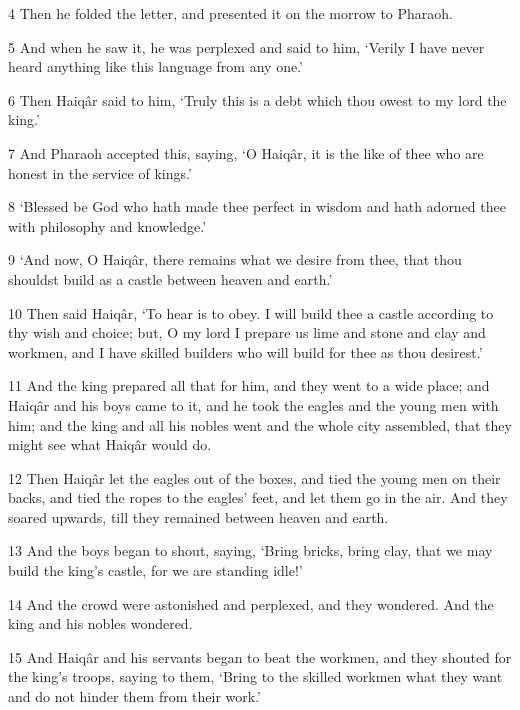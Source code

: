 \par 4 Then he folded the letter, and presented it on the morrow to Pharaoh.

\par 5 And when he saw it, he was perplexed and said to him, ‘Verily I have never heard anything like this language from any one.’

\par 6 Then Haiqâr said to him, ‘Truly this is a debt which thou owest to my lord the king.’

\par 7 And Pharaoh accepted this, saying, ‘O Haiqâr, it is the like of thee who are honest in the service of kings.’

\par 8 ‘Blessed be God who hath made thee perfect in wisdom and hath adorned thee with philosophy and knowledge.’

\par 9 ‘And now, O Haiqâr, there remains what we desire from thee, that thou shouldst build as a castle between heaven and earth.’

\par 10 Then said Haiqâr, ‘To hear is to obey. I will build thee a castle according to thy wish and choice; but, O my lord I prepare us lime and stone and clay and workmen, and I have skilled builders who will build for thee as thou desirest.’

\par 11 And the king prepared all that for him, and they went to a wide place; and Haiqâr and his boys came to it, and he took the eagles and the young men with him; and the king and all his nobles went and the whole city assembled, that they might see what Haiqâr would do.

\par 12 Then Haiqâr let the eagles out of the boxes, and tied the young men on their backs, and tied the ropes to the eagles' feet, and let them go in the air. And they soared upwards, till they remained between heaven and earth.

\par 13 And the boys began to shout, saying, ‘Bring bricks, bring clay, that we may build the king's castle, for we are standing idle!’

\par 14 And the crowd were astonished and perplexed, and they wondered. And the king and his nobles wondered.

\par 15 And Haiqâr and his servants began to beat the workmen, and they shouted for the king's troops, saying to them, ‘Bring to the skilled workmen what they want and do not hinder them from their work.’

